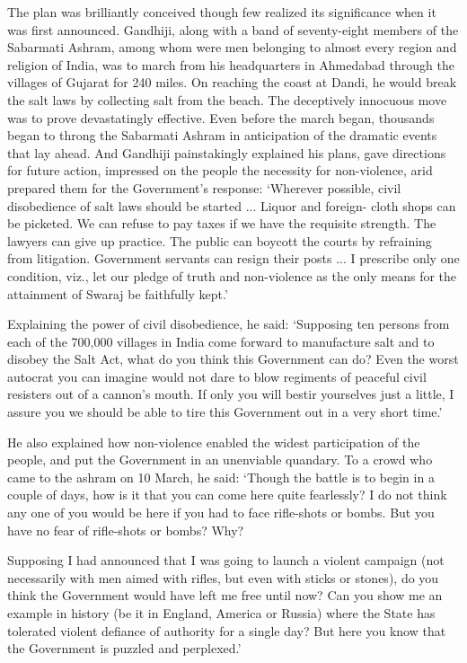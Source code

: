 The plan was brilliantly conceived though few realized its significance when it was first announced. Gandhiji, along with a band of seventy-eight members of the Sabarmati Ashram, among whom were men belonging to almost every region and religion of India, was to march from his headquarters in Ahmedabad through the villages of Gujarat for 240 miles. On reaching the coast at Dandi, he would break the salt laws by collecting salt from the beach. The deceptively innocuous move was to prove devastatingly effective. Even before the march began, thousands began to throng the Sabarmati Ashram in anticipation of the dramatic events that lay ahead. And Gandhiji painstakingly explained his plans, gave directions for future action, impressed on the people the necessity for non-violence, arid prepared them for the Government's response: `Wherever possible, civil disobedience of salt laws should be started ... Liquor and foreign- cloth shops can be picketed. We can refuse to pay taxes if we have the requisite strength. The lawyers can give up practice. The public can boycott the courts by refraining from litigation. Government servants can resign their posts ... I prescribe only one condition, viz., let our pledge of truth and non-violence as the only means for the attainment of Swaraj be faithfully kept.'

Explaining the power of civil disobedience, he said: `Supposing ten persons from each of the 700,000 villages in India come forward to manufacture salt and to disobey the Salt Act, what do you think this Government can do? Even the worst autocrat you can imagine would not dare to blow regiments of peaceful civil resisters out of a cannon's mouth. If only you will bestir yourselves just a little, I assure you we should be able to tire this Government out in a very short time.'

He also explained how non-violence enabled the widest participation of the people, and put the Government in an unenviable quandary. To a crowd who came to the ashram on 10 March, he said: `Though the battle is to begin in a couple of days, how is it that you can come here quite fearlessly? I do not think any one of you would be here if you had to face rifle-shots or bombs. But you have no fear of rifle-shots or bombs? Why?

Supposing I had announced that I was going to launch a violent campaign (not necessarily with men aimed with rifles, but even with sticks or stones), do you think the Government would have left me free until now? Can you show me an example in history (be it in England, America or Russia) where the State has tolerated violent defiance of authority for a single day? But here you know that the Government is puzzled and perplexed.'

